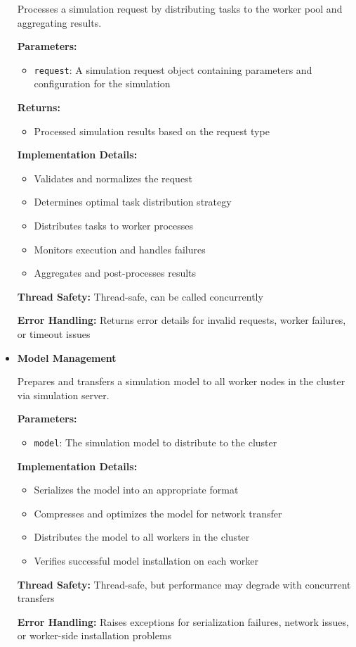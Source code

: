 \begin{itemize}
	
	Processes a simulation request by distributing tasks to the worker pool and aggregating results.
	
	\textbf{Parameters:}
	\begin{itemize}
		\item \texttt{request}: A simulation request object containing parameters and configuration for the simulation
	\end{itemize}
	
	\textbf{Returns:}
	\begin{itemize}
		\item Processed simulation results based on the request type
	\end{itemize}
	
	\textbf{Implementation Details:}
	\begin{itemize}
		\item Validates and normalizes the request
		\item Determines optimal task distribution strategy
		\item Distributes tasks to worker processes
		\item Monitors execution and handles failures
		\item Aggregates and post-processes results
	\end{itemize}
	
	\textbf{Thread Safety:} Thread-safe, can be called concurrently
	
	\textbf{Error Handling:} Returns error details for invalid requests, worker failures, or timeout issues
	
	\item \textbf{Model Management}
	
	
	Prepares and transfers a simulation model to all worker nodes in the cluster via simulation server.
	
	\textbf{Parameters:}
	\begin{itemize}
		\item \texttt{model}: The simulation model to distribute to the cluster
	\end{itemize}
	
	\textbf{Implementation Details:}
	\begin{itemize}
		\item Serializes the model into an appropriate format
		\item Compresses and optimizes the model for network transfer
		\item Distributes the model to all workers in the cluster
		\item Verifies successful model installation on each worker
	\end{itemize}
	
	\textbf{Thread Safety:} Thread-safe, but performance may degrade with concurrent transfers
	
	\textbf{Error Handling:} Raises exceptions for serialization failures, network issues, or worker-side installation problems
	
\end{itemize}

